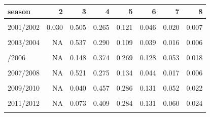 \begin{table}[!h]
\centering
\begin{tabular}{lrrrrrrr}
\toprule
season & 2 & 3 & 4 & 5 & 6 & 7 & 8\\
\midrule
\cellcolor{gray!10}{2000/2001} & \cellcolor{gray!10}{0.141} & \cellcolor{gray!10}{0.478} & \cellcolor{gray!10}{0.247} & \cellcolor{gray!10}{0.087} & \cellcolor{gray!10}{0.033} & \cellcolor{gray!10}{0.010} & \cellcolor{gray!10}{0.003}\\
2001/2002 & 0.030 & 0.505 & 0.265 & 0.121 & 0.046 & 0.020 & 0.007\\
\cellcolor{gray!10}{2002/2003} & \cellcolor{gray!10}{0.166} & \cellcolor{gray!10}{0.459} & \cellcolor{gray!10}{0.235} & \cellcolor{gray!10}{0.097} & \cellcolor{gray!10}{0.030} & \cellcolor{gray!10}{0.008} & \cellcolor{gray!10}{0.004}\\
2003/2004 & NA & 0.537 & 0.290 & 0.109 & 0.039 & 0.016 & 0.006\\
\cellcolor{gray!10}{2004/2005} & \cellcolor{gray!10}{NA} & \cellcolor{gray!10}{0.515} & \cellcolor{gray!10}{0.309} & \cellcolor{gray!10}{0.121} & \cellcolor{gray!10}{0.036} & \cellcolor{gray!10}{0.011} & \cellcolor{gray!10}{0.004}\\
\addlinespace
2005/2006 & NA & 0.148 & 0.374 & 0.269 & 0.128 & 0.053 & 0.018\\
\cellcolor{gray!10}{2006/2007} & \cellcolor{gray!10}{NA} & \cellcolor{gray!10}{0.015} & \cellcolor{gray!10}{0.324} & \cellcolor{gray!10}{0.257} & \cellcolor{gray!10}{0.193} & \cellcolor{gray!10}{0.103} & \cellcolor{gray!10}{0.049}\\
2007/2008 & NA & 0.521 & 0.275 & 0.134 & 0.044 & 0.017 & 0.006\\
\cellcolor{gray!10}{2008/2009} & \cellcolor{gray!10}{NA} & \cellcolor{gray!10}{0.154} & \cellcolor{gray!10}{0.368} & \cellcolor{gray!10}{0.250} & \cellcolor{gray!10}{0.140} & \cellcolor{gray!10}{0.059} & \cellcolor{gray!10}{0.018}\\
2009/2010 & NA & 0.040 & 0.457 & 0.286 & 0.131 & 0.052 & 0.022\\
\addlinespace
\cellcolor{gray!10}{2010/2011} & \cellcolor{gray!10}{NA} & \cellcolor{gray!10}{0.290} & \cellcolor{gray!10}{0.313} & \cellcolor{gray!10}{0.201} & \cellcolor{gray!10}{0.103} & \cellcolor{gray!10}{0.052} & \cellcolor{gray!10}{0.022}\\
2011/2012 & NA & 0.073 & 0.409 & 0.284 & 0.131 & 0.060 & 0.024\\
\cellcolor{gray!10}{2012/2013} & \cellcolor{gray!10}{NA} & \cellcolor{gray!10}{0.048} & \cellcolor{gray!10}{0.316} & \cellcolor{gray!10}{0.285} & \cellcolor{gray!10}{0.181} & \cellcolor{gray!10}{0.095} & \cellcolor{gray!10}{0.043}\\

\end{tabular}
\end{table}
